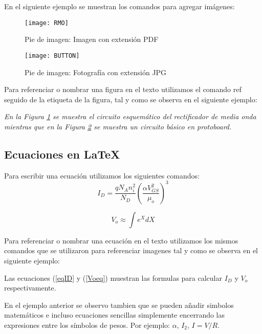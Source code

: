En el siguiente ejemplo se muestran los comandos para agregar imágenes:

\begin{figure}[h!] \centering 
\texttt{[image: RMO]}    %
\caption{Pie de imagen: Imagen con extensión PDF}  %
\label{Fig:Rectificador}         %
\end{figure}  

\begin{figure}[h!] \centering
\texttt{[image: BUTTON]}
\caption{Pie de imagen: Fotografía con extensión  JPG}
\label{Fig:PushButton}
\end{figure}  


Para referenciar o nombrar una figura en el texto utilizamos el comando ref seguido de la etiqueta de la figura, tal y como se observa en el siguiente ejemplo: 

\textit{En la Figura \ref{Fig:Rectificador} se muestra el circuito esquemático del  rectificador de media onda mientras que  en la Figura \ref{Fig:PushButton} se muestra un circuito básico en protoboard.}


\subsection{Ecuaciones en LaTeX}

Para escribir una ecuación utilizamos los siguientes comandos:
\begin{equation}
\label{eqID}        %
I_D=\frac{q N_A n_i^2}{N_D}\left(\frac{\alpha V_{GS}^2}{\mu_o}\right)^3
\end{equation}

\begin{equation}\label{Voeq} 
V_o \approx \int e^XdX
\end{equation}

Para referenciar o nombrar una ecuación en el texto utilizamos los mismos comandos que se utilizaron para referenciar imagenes tal y como se observa en el siguiente ejemplo:

Las ecuaciones (\ref{eqID} y (\ref{Voeq}) muestran las formulas para calcular $I_D$ y $V_o$ respectivamente.

En el ejemplo anterior se observo tambien que se pueden añadir simbolos matemáticos e incluso ecuaciones sencillas simplemente encerrando las expresiones entre los símbolos de pesos. Por ejemplo: $\alpha$, $I_2$, $I=V/R$. 


